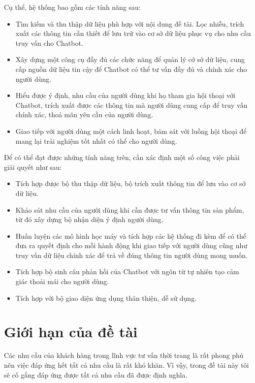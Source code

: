 Cụ thể, hệ thống bao gồm các tính năng sau:

\begin{itemize}
    \item Tìm kiếm và thu thập dữ liệu phù hợp với nội dung đề tài.
    Lọc nhiễu, trích xuất các thông tin cần thiết để lưu trữ vào cơ sở
    dữ liệu phục vụ cho nhu cầu truy vấn cho Chatbot.
    \item Xây dựng một công cụ đầy đủ các chức năng để quản lý cở sở
    dữ liệu, cung cấp nguồn dữ liệu tin cậy để Chatbot có thể tư vấn
    đầy đủ và chính xác cho người dùng.
    \item Hiểu được ý định, nhu cầu của người dùng khi họ tham gia
    hội thoại với Chatbot, trích xuất được các thông tin mà người dùng
    cung cấp để truy vấn chính xác, thoả mãn yêu cầu của người dùng.
    \item Giao tiếp với người dùng một cách linh hoạt, bám sát với
    luồng hội thoại để mang lại trải nghiệm tốt nhất có thể cho người dùng.
\end{itemize}

Để có thể đạt được những tính năng trên, cần xác định một số công việc
phải giải quyết như sau:

\begin{itemize}
    \item Tích hợp được bộ thu thập dữ liệu, bộ trích xuất thông tin
    để lưu vào cơ sở dữ liệu.
    \item Khảo sát nhu cầu của người dùng khi cần được tư vấn thông tin
    sản phẩm, từ đó xây dựng bộ nhận diện ý định người dùng.
    \item Huấn luyện các mô hình học máy và tích hợp các hệ thống
    đi kèm để có thể đưa ra quyết định cho mỗi hành động khi giao tiếp
    với người dùng cũng như truy vấn dữ liệu chính xác để trả về
    đúng thông tin người dùng mong muốn.
    \item Tích hợp bộ sinh câu phản hồi của Chatbot với ngôn từ
    tự nhiên tạo cảm giác thoải mái cho người dùng.
    \item Tích hợp với bộ giao diện ứng dụng thân thiện, dễ sử dụng.
\end{itemize}

\section{Giới hạn của đề tài}
Các nhu cầu của khách hàng trong lĩnh vực tư vấn thời trang là
rất phong phú nên việc đáp ứng hết tất cả nhu cầu là rất khó khăn.
Vì vậy, trong đề tài này tôi sẽ cố gắng đáp ứng được tất cả nhu cầu
đã được định nghĩa.

